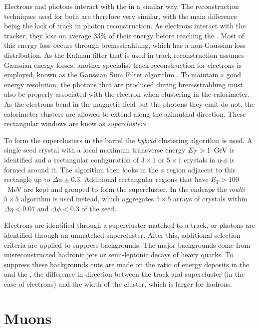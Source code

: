 Electrons and photons interact with the \ECAL in a similar way.
The reconstruction techniques used for both are therefore very similar, with
the main difference being the lack of track in photon reconstruction.
As electrons interact with the tracker, they lose on average $33\%$ of
their energy before reaching the \ECAL \cite{1748-0221-10-06-P06005}.
Most of this energy loss occurs through bremsstrahlung, which has a
non-Gaussian loss distribution. As the Kalman filter that is used in
track reconstruction assumes Gaussian energy losses, another specialist
track reconstruction for electrons is employed, known as the Gaussian
Sum Filter algorithm \cite{Adam:815410}. To maintain a good energy
resolution, the photons that are produced during bremsstrahlung must
also be properly associated with the electron when clustering in the
calorimeter. As the electrons bend in the magnetic field but the
photons they emit do not, the calorimeter clusters are allowed to
extend along the azimuthal direction. These rectangular \ECAL windows
are know as \emph{superclusters}.

To form the superclusters in the barrel the \emph{hybrid} clustering
algorithm is used. A single seed crystal with a local maximum
transverse energy $E_T>1~\mathrm{\,Ge\kern -0.1em V}$ is identified and a rectangular
configuration of $3\times 1$ or $5\times 1$ crystals in $\eta$-$\phi$
is formed around it. The algorithm then looks in the $\phi$ region
adjacent to this rectangle up to $\Delta\phi\pm 0.3$.
Additional rectangular regions that have $E_T>100$~MeV are kept and
grouped to form the supercluster. In the endcaps the \emph{multi $5\times
5$} algorithm is used instead, which aggregates $5\times 5$ arrays of
crystals within $\Delta\eta<0.07$ and $\Delta\phi<0.3$ of the seed.

Electrons are identified through a supercluster matched to a track, or
photons are identified through an unmatched supercluster. After
this, additional selection criteria are applied to suppress
backgrounds. The major backgrounds come from misreconstructed hadronic
jets or semi-leptonic decays of heavy quarks. To suppress these
backgrounds cuts
are made on the ratio of energy deposits in the \HCAL and the \ECAL, the
difference in direction between the track and supercluster (in the
case of electrons) and the width of the cluster, which is larger for
hadrons.

\section{Muons}
\label{sec:muons_reco}

